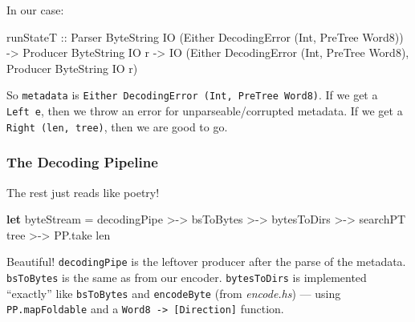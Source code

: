 \documentclass[]{article}
\newenvironment{Shaded}{}{}
\newcommand{\KeywordTok}[1]{\textcolor[rgb]{0.00,0.44,0.13}{\textbf{{#1}}}}
\newcommand{\DataTypeTok}[1]{\textcolor[rgb]{0.56,0.13,0.00}{{#1}}}
\newcommand{\OtherTok}[1]{\textcolor[rgb]{0.00,0.44,0.13}{{#1}}}
\newcommand{\FunctionTok}[1]{\textcolor[rgb]{0.02,0.16,0.49}{{#1}}}
\newcommand{\NormalTok}[1]{{#1}}
\begin{document}
In our case:

\begin{Shaded}
\begin{Highlighting}[]
\NormalTok{runStateT}
\OtherTok{  ::} \DataTypeTok{Parser}   \DataTypeTok{ByteString} \DataTypeTok{IO} \NormalTok{(}\DataTypeTok{Either} \DataTypeTok{DecodingError} \NormalTok{(}\DataTypeTok{Int}\NormalTok{, }\DataTypeTok{PreTree} \DataTypeTok{Word8}\NormalTok{))}
  \OtherTok{->} \DataTypeTok{Producer} \DataTypeTok{ByteString} \DataTypeTok{IO} \NormalTok{r}
  \OtherTok{->} \DataTypeTok{IO} \NormalTok{(}\DataTypeTok{Either} \DataTypeTok{DecodingError} \NormalTok{(}\DataTypeTok{Int}\NormalTok{, }\DataTypeTok{PreTree} \DataTypeTok{Word8}\NormalTok{), }\DataTypeTok{Producer} \DataTypeTok{ByteString} \DataTypeTok{IO} \NormalTok{r)}
\end{Highlighting}
\end{Shaded}

So \texttt{metadata} is
\texttt{Either\ DecodingError\ (Int,\ PreTree\ Word8)}. If we get a
\texttt{Left\ e}, then we throw an error for unparseable/corrupted
metadata. If we get a \texttt{Right\ (len,\ tree)}, then we are good to
go.

\subsubsection{The Decoding Pipeline}\label{the-decoding-pipeline}

The rest just reads like poetry!

\begin{Shaded}
\begin{Highlighting}[]
\KeywordTok{let} \NormalTok{byteStream }\FunctionTok{=} \NormalTok{decodingPipe }\FunctionTok{>->} \NormalTok{bsToBytes}
             \FunctionTok{>->} \NormalTok{bytesToDirs  }\FunctionTok{>->} \NormalTok{searchPT tree}
             \FunctionTok{>->} \NormalTok{PP.take len}
\end{Highlighting}
\end{Shaded}

Beautiful! \texttt{decodingPipe} is the leftover producer after the
parse of the metadata. \texttt{bsToBytes} is the same as from our
encoder. \texttt{bytesToDirs} is implemented ``exactly'' like
\texttt{bsToBytes} and \texttt{encodeByte} (from \emph{encode.hs}) ---
using \texttt{PP.mapFoldable} and a
\texttt{Word8\ -\textgreater{}\ {[}Direction{]}} function.
\end{document}
